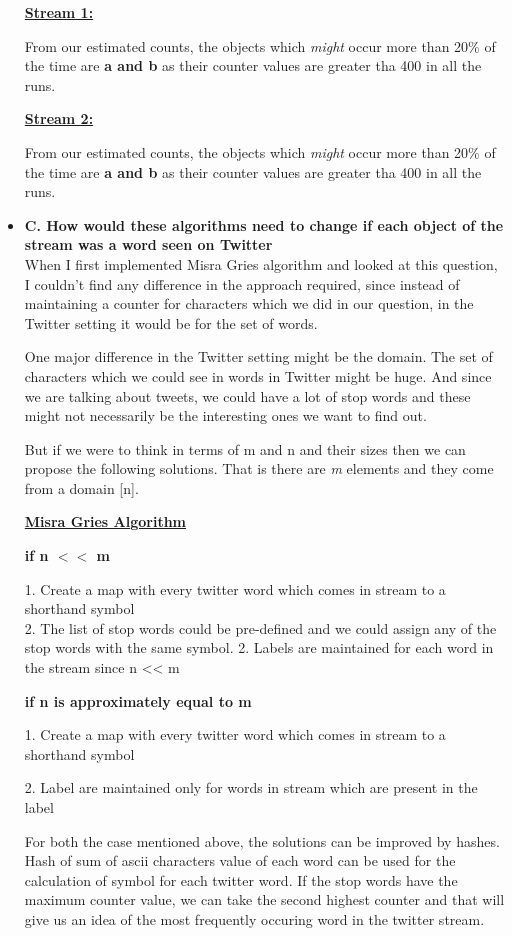 \documentclass[11pt]{article}
\begin{document}
\begin{itemize}
\textbf{\underline{Stream 1:}}

From our estimated counts, the objects which \emph{might} occur more than 20\% of the time  are \textbf{a and b} as their counter values are greater tha 400 in all the runs.	 

\textbf{\underline{Stream 2:}}

From our estimated counts, the objects which \emph{might} occur more than 20\% of the time  are \textbf{a and b} as their counter values are greater tha 400 in all the runs.	 


\item[] \textbf{C. How would these algorithms need to change if each object of the stream was a word seen on Twitter }\\

When I first implemented Misra Gries algorithm and looked at this question, I couldn't find any difference in the approach required, since instead of maintaining a counter for characters which we did in our question, in the Twitter setting it would be for the set of words. 

One major difference in the Twitter setting might be the domain. The set of characters which we could see in words in Twitter might be huge. And since we are talking about tweets, we could have a lot of stop words and these might not necessarily be the interesting ones we want to find out.

But if we were to think in terms of m and n and their sizes then we can propose the following solutions. That is there are \emph m elements and they come from a domain [n].

\textbf{\underline{Misra Gries Algorithm}}

\textbf{ if n $<<$ m} 

1. Create a map with every twitter word which comes in stream to a shorthand symbol\\
2. The list of stop words could be pre-defined and we could assign any of the stop words with the same symbol.
2. Labels are maintained for each word in the stream since n << m

\textbf{ if n is approximately equal to m}


1. Create a map with every twitter word which comes in stream to a shorthand symbol

2. Label are maintained only for words in stream which are present in the label

For both the case mentioned above, the solutions can be improved by hashes. Hash of sum of ascii characters value of each word can be used for the calculation of symbol for each twitter word. If the stop words have the maximum counter value, we can take the second highest counter and that will give us an idea of the most frequently occuring word in the twitter stream.


\end{itemize}
\end{document}
